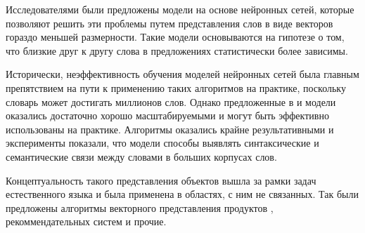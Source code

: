 \documentclass[times,specification,annotation]{itmo-student-thesis}
\begin{document}
Исследователями были предложены модели на основе нейронных сетей\cite{turian2010}, которые позволяют решить эти проблемы путем представления слов в виде векторов гораздо меньшей размерности. Такие модели основываются на гипотезе о том, что близкие друг к другу слова в предложениях статистически более зависимы.

Исторически, неэффективность обучения моделей нейронных сетей была главным препятствием на пути к применению таких алгоритмов на практике, поскольку словарь может достигать миллионов слов. Однако предложенные в \cite{mikolov2013efficient} и \cite{mikolov2013distributed} модели оказались достаточно хорошо масштабируемыми и могут быть эффективно использованы на практике. Алгоритмы оказались крайне результативными и эксперименты показали, что модели способы выявлять синтаксические и семантические связи между словами в больших корпусах слов. 

Концептуальность такого представления объектов вышла за рамки задач естественного языка и была применена в областях, с ним не связанных. Так были предложены алгоритмы векторного представления продуктов \cite{grbovic2015commerce}, рекоммендательных систем \cite{ozsoy2016word} и прочие.





\end{document}
